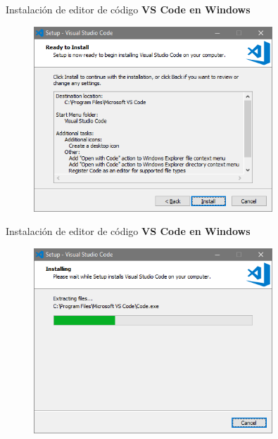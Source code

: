 \begin{frame}[fragile]{Instalación de editor de código}
  \textbf{VS Code en Windows}
   \begin{figure}
     \includegraphics[width=0.8\textwidth]{./resources/VSCODE_Step_06.PNG}
   \end{figure}
\end{frame}

\begin{frame}[fragile]{Instalación de editor de código}
  \textbf{VS Code en Windows}
   \begin{figure}
     \includegraphics[width=0.8\textwidth]{./resources/VSCODE_Step_07.PNG}
   \end{figure}
\end{frame}

